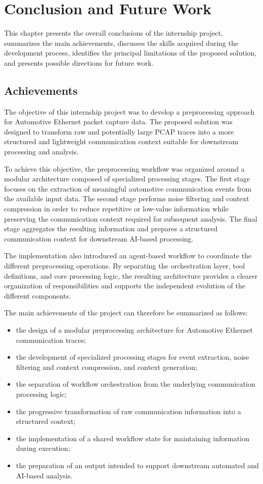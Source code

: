 \chapter{Conclusion and Future Work}

This chapter presents the overall conclusions of the internship project, summarizes the main achievements, discusses the skills acquired during the development process, identifies the principal limitations of the proposed solution, and presents possible directions for future work.

\section{Achievements}

The objective of this internship project was to develop a preprocessing approach for Automotive Ethernet packet capture data. The proposed solution was designed to transform raw and potentially large PCAP traces into a more structured and lightweight communication context suitable for downstream processing and analysis.

To achieve this objective, the preprocessing workflow was organized around a modular architecture composed of specialized processing stages. The first stage focuses on the extraction of meaningful automotive communication events from the available input data. The second stage performs noise filtering and context compression in order to reduce repetitive or low-value information while preserving the communication context required for subsequent analysis. The final stage aggregates the resulting information and prepares a structured communication context for downstream AI-based processing.

The implementation also introduced an agent-based workflow to coordinate the different preprocessing operations. By separating the orchestration layer, tool definitions, and core processing logic, the resulting architecture provides a clearer organization of responsibilities and supports the independent evolution of the different components.

The main achievements of the project can therefore be summarized as follows:

\begin{itemize}
    \item the design of a modular preprocessing architecture for Automotive Ethernet communication traces;
    \item the development of specialized processing stages for event extraction, noise filtering and context compression, and context generation;
    \item the separation of workflow orchestration from the underlying communication processing logic;
    \item the progressive transformation of raw communication information into a structured context;
    \item the implementation of a shared workflow state for maintaining information during execution;
    \item the preparation of an output intended to support downstream automated and AI-based analysis.
\end{itemize}

